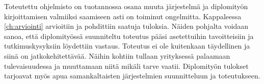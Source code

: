 Toteutettu ohjelmisto on tuotannossa osana muuta järjestelmä ja diplomityön kirjoittamisen valmiiksi saamiseen asti on toiminut ongelmitta. Kappaleessa \ref{ch:arviointi} arvioitiin ja pohdittiin saatuja tuloksia. Näiden pohjalta voidaan sanoa, että diplomityössä suunniteltu toteutus pääsi asetettuihin tavoitteisiin ja tutkimuskysyksiin löydettiin vastaus. Toteutus ei ole kuitenkaan täydellinen ja siinä on jatkokehitettävää. Näihin kohtiin tullaan yrityksessä palaamaan tulevaisuudessa ja muuttamaan niitä mikäli tarve vaatii. Diplomityön tulokset tarjoavat myös apua samankaltaisten järjestelmien suunnitteluun ja toteutukseen.